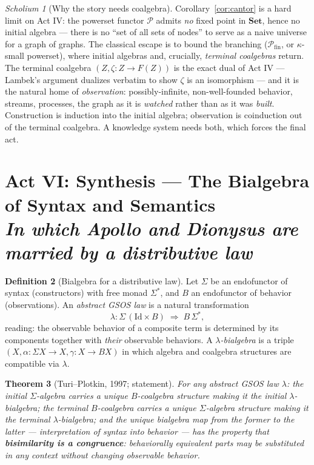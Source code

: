 \documentclass[11pt]{article}
\theoremstyle{plain}
\newtheorem{theorem}{Theorem}[section]
\theoremstyle{definition}
\newtheorem{definition}[theorem]{Definition}
\theoremstyle{remark}
\newtheorem{scholium}[theorem]{Scholium}
\newcommand{\Set}{\mathbf{Set}}
\newcommand{\act}[2]{\section{#1 \\ {\normalsize\normalfont\itshape #2}}}
\begin{document}
\begin{scholium}[Why the story needs coalgebra]
Corollary~\ref{cor:cantor} is a hard limit on Act IV: the powerset functor $\mathcal{P}$ admits \emph{no} fixed point in $\Set$, hence no initial algebra --- there is no ``set of all sets of nodes'' to serve as a naive universe for a graph of graphs. The classical escape is to bound the branching ($\mathcal{P}_{\mathrm{fin}}$, or $\kappa$-small powerset), where initial algebras and, crucially, \emph{terminal coalgebras} return. The terminal coalgebra $(Z, \zeta\colon Z \to F(Z))$ is the exact dual of Act IV --- Lambek's argument dualizes verbatim to show $\zeta$ is an isomorphism --- and it is the natural home of \emph{observation}: possibly-infinite, non-well-founded behavior, streams, processes, the graph as it is \emph{watched} rather than as it was \emph{built}. Construction is induction into the initial algebra; observation is coinduction out of the terminal coalgebra. A knowledge system needs both, which forces the final act.
\end{scholium}

\act{Act VI: Synthesis --- The Bialgebra of Syntax and Semantics}{In which Apollo and Dionysus are married by a distributive law}

\begin{definition}[Bialgebra for a distributive law]
Let $\Sigma$ be an endofunctor of syntax (constructors) with free monad $\Sigma^{*}$, and $B$ an endofunctor of behavior (observations). An \emph{abstract GSOS law} is a natural transformation
\[
\lambda\colon \Sigma\,(\mathrm{Id} \times B) \;\Longrightarrow\; B\,\Sigma^{*},
\]
reading: the observable behavior of a composite term is determined by its components together with \emph{their} observable behaviors. A \emph{$\lambda$-bialgebra} is a triple $(X, \alpha\colon \Sigma X \to X, \gamma\colon X \to BX)$ in which algebra and coalgebra structures are compatible via $\lambda$.
\end{definition}

\begin{theorem}[Turi--Plotkin, 1997; statement]\label{thm:tp}
For any abstract GSOS law $\lambda$: the initial $\Sigma$-algebra carries a unique $B$-coalgebra structure making it the initial $\lambda$-bialgebra; the terminal $B$-coalgebra carries a unique $\Sigma$-algebra structure making it the terminal $\lambda$-bialgebra; and the unique bialgebra map from the former to the latter --- interpretation of syntax into behavior --- has the property that \textbf{bisimilarity is a congruence}: behaviorally equivalent parts may be substituted in any context without changing observable behavior.
\end{theorem}
\end{document}
